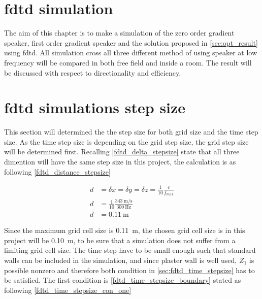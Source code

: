\section{\gls{fdtd} simulation} \label{sec:fdtd_simulation}
The aim of this chapter is to make a simulation of the zero order gradient speaker, first order gradient speaker and the solution proposed in \autoref{sec:opt_result} using \gls{fdtd}. All simulation cross all three different method of using speaker at low frequency will be compared in both free field and inside a room. The result will be discussed with respect to directionality and efficiency. 

\section{\gls{fdtd} simulations step size}
This section will determined the the step size for both grid size and the time step size. As the time step size is depending on the grid step size, the grid step size will be determined first. Recalling \autoref{fdtd_delta_stepsize} state that all three dimention will have the same step size in this project, the calculation is as following \autoref{fdtd_distance_stepsize} 

\begin{subequations}\label{fdtd_distance_stepsize}
\begin{alignat}{2}
d &= \delta x = \delta y = \delta z= \frac{1}{10} \frac{c}{f_{max}} \label{fdtd_distance_stepsize_1}\\
d &= \frac{1}{10} \frac{\SI{343}{\meter\per\second}}{\SI{300}{\hertz}} \label{fdtd_distance_stepsize_2}\\
d &= \SI{0.11}{\meter} \label{fdtd_distance_stepsize_3}
\end{alignat}
\end{subequations}

    \startexplain
    \stopexplain

Since the maximum grid cell size is \SI{0.11}{\meter}, the chosen grid cell size is in this project will be \SI{0.10}{\meter}, to be sure that a simulation does not suffer from a limiting grid cell size. The time step have to be small enough such that standard walls can be included in the simulation, and since plaster wall is well used, $Z_{1}$ is possible nonzero and therefore both condition in \autoref{sec:fdtd_time_stepsize} has to be satisfied. The first condition is \autoref{fdtd_time_stepsize_boundary} stated as following \autoref{fdtd_time_stepsize_con_one}
    

